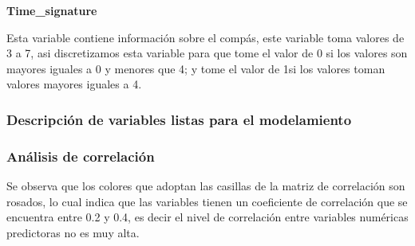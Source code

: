 \documentclass[
  letterpaper,
  DIV=11,
  numbers=noendperiod]{scrartcl}
\begin{document}
\textbf{Time\_signature}

Esta variable contiene información sobre el compás, este variable toma
valores de 3 a 7, asi discretizamos esta variable para que tome el valor
de 0 si los valores son mayores iguales a 0 y menores que 4; y tome el
valor de 1si los valores toman valores mayores iguales a 4.

\hypertarget{descripciuxf3n-de-variables-listas-para-el-modelamiento}{%
\subsubsection{Descripción de variables listas para el
modelamiento}\label{descripciuxf3n-de-variables-listas-para-el-modelamiento}}

\hypertarget{anuxe1lisis-de-correlaciuxf3n}{%
\subsubsection{Análisis de
correlación}\label{anuxe1lisis-de-correlaciuxf3n}}

Se observa que los colores que adoptan las casillas de la matriz de
correlación son rosados, lo cual indica que las variables tienen un
coeficiente de correlación que se encuentra entre 0.2 y 0.4, es decir el
nivel de correlación entre variables numéricas predictoras no es muy
alta.
\end{document}
